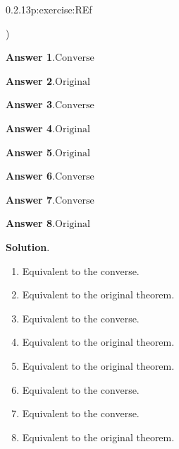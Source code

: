 \documentclass[twoside,11pt,]{book}
\newcommand{\blocktitlefont}{\relax}
\numberwithin{equation}{chapter}
\begin{document}
\begin{divisionsolution}{0.2.13}{}{p:exercise:REf}
\begin{enumerate}[label=(\alph*)]
\begin{itemize*}[label=$\square$,leftmargin=3em,itemjoin=\hspace{1em}]
\end{itemize*})\quad
%
\end{enumerate}
%
\par\smallskip%
\noindent\textbf{\blocktitlefont Answer 1}.\quad{}\(\text{Converse}\)%
\par\smallskip%
\noindent\textbf{\blocktitlefont Answer 2}.\quad{}\(\text{Original}\)%
\par\smallskip%
\noindent\textbf{\blocktitlefont Answer 3}.\quad{}\(\text{Converse}\)%
\par\smallskip%
\noindent\textbf{\blocktitlefont Answer 4}.\quad{}\(\text{Original}\)%
\par\smallskip%
\noindent\textbf{\blocktitlefont Answer 5}.\quad{}\(\text{Original}\)%
\par\smallskip%
\noindent\textbf{\blocktitlefont Answer 6}.\quad{}\(\text{Converse}\)%
\par\smallskip%
\noindent\textbf{\blocktitlefont Answer 7}.\quad{}\(\text{Converse}\)%
\par\smallskip%
\noindent\textbf{\blocktitlefont Answer 8}.\quad{}\(\text{Original}\)%
\par\smallskip%
\noindent\textbf{\blocktitlefont Solution}.\quad{}%
\begin{enumerate}[label=(\alph*)]
\item{}Equivalent to the converse.%
\item{}Equivalent to the original theorem.%
\item{}Equivalent to the converse.%
\item{}Equivalent to the original theorem.%
\item{}Equivalent to the original theorem.%
\item{}Equivalent to the converse.%
\item{}Equivalent to the converse.%
\item{}Equivalent to the original theorem.%
\end{enumerate}
%
\end{divisionsolution}%
\end{document}
